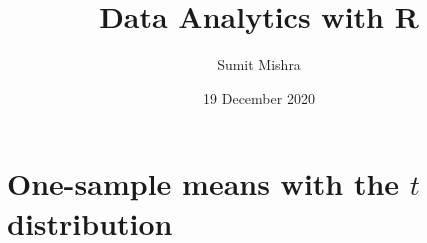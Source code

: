 \documentclass[notes,11pt, aspectratio=169]{beamer}
\title[DAR]{Data Analytics with R}  %
\author{Sumit Mishra} %
\institute[IFMR] %
{
  Institute for Financial Management and Research, Sri City \\ %
  \medskip
  \medskip
  \textbf{Inference for numerical data} %
}
\date{19 December 2020} %
\begin{document}

  
 {
    \addtocounter{framenumber}{-1} 
    {\removepagenumbers 
      \begin{frame}
      
      
      \titlepage
      
      \end{frame}
    }
  }




\section{One-sample means with the $t$ distribution}

\end{document}
